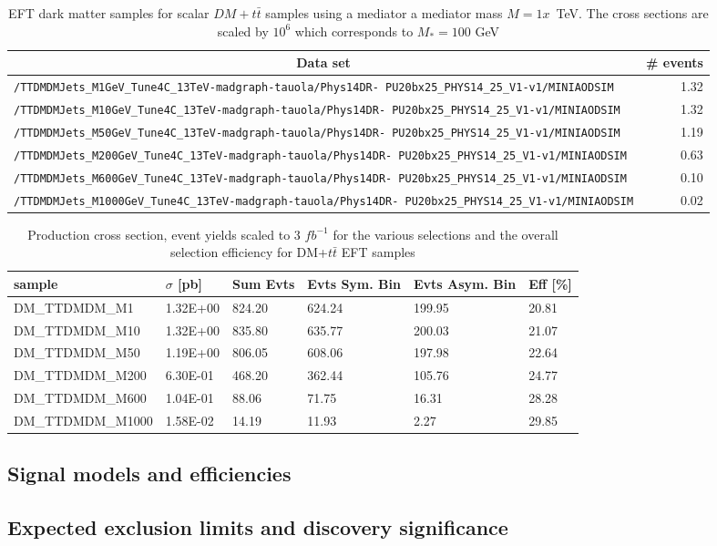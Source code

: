\begin{sidewaystable}[h]
    \centering
    \caption{EFT dark matter samples for scalar $DM+t\bar{t}$ samples using a mediator a mediator mass $M=1x$~TeV. The cross sections are scaled by $10^6$ which corresponds to $M_*=100$ GeV \label{tab:datasets_dm}}
    \begin{tabular}{lr}
      \hline\hline
      \multicolumn{1}{c}{Data set}&\multicolumn{1}{c}{\# events}\tabularnewline
      \hline
      {\footnotesize \verb!/TTDMDMJets_M1GeV_Tune4C_13TeV-madgraph-tauola/Phys14DR- PU20bx25_PHYS14_25_V1-v1/MINIAODSIM!}   & 1.32 \tabularnewline
      {\footnotesize \verb!/TTDMDMJets_M10GeV_Tune4C_13TeV-madgraph-tauola/Phys14DR- PU20bx25_PHYS14_25_V1-v1/MINIAODSIM!}  & 1.32 \tabularnewline
      {\footnotesize \verb!/TTDMDMJets_M50GeV_Tune4C_13TeV-madgraph-tauola/Phys14DR- PU20bx25_PHYS14_25_V1-v1/MINIAODSIM!}  & 1.19 \tabularnewline
      {\footnotesize \verb!/TTDMDMJets_M200GeV_Tune4C_13TeV-madgraph-tauola/Phys14DR- PU20bx25_PHYS14_25_V1-v1/MINIAODSIM!} & 0.63 \tabularnewline
      {\footnotesize \verb!/TTDMDMJets_M600GeV_Tune4C_13TeV-madgraph-tauola/Phys14DR- PU20bx25_PHYS14_25_V1-v1/MINIAODSIM!} & 0.10 \tabularnewline
      {\footnotesize \verb!/TTDMDMJets_M1000GeV_Tune4C_13TeV-madgraph-tauola/Phys14DR- PU20bx25_PHYS14_25_V1-v1/MINIAODSIM!}& 0.02 \tabularnewline
      \hline \hline
\end{tabular}
\end{sidewaystable}


\begin{table}[h]
\centering
\begin{tabular}{llllll}
\hline
sample             & $\sigma$ [pb] & Sum Evts       & Evts Sym. Bin & Evts Asym. Bin & Eff  [\%]   \\\hline
DM\_TTDMDM\_M1    & 1.32E+00 & 824.20 & 624.24 & 199.95 & 20.81 \\
DM\_TTDMDM\_M10   & 1.32E+00 & 835.80 & 635.77 & 200.03 & 21.07 \\
DM\_TTDMDM\_M50   & 1.19E+00 & 806.05 & 608.06 & 197.98 & 22.64 \\
DM\_TTDMDM\_M200  & 6.30E-01 & 468.20 & 362.44 & 105.76 & 24.77 \\
DM\_TTDMDM\_M600  & 1.04E-01 & 88.06  & 71.75  & 16.31  & 28.28 \\
DM\_TTDMDM\_M1000 & 1.58E-02 & 14.19  & 11.93  & 2.27   & 29.85\\
\hline
\end{tabular}
\caption{Production cross section, event yields scaled to 3 $fb^{-1 }$ for the various selections and the overall selection efficiency for DM+$t\bar{t}$ EFT samples}
\label{tab:dm_dmtt_EFT_g1}
\end{table}

\subsection{Signal models and efficiencies}
\label{subsec:darkmatter_models}


\subsection{Expected exclusion limits and discovery significance}
\label{subsec:darkmatter_results}


